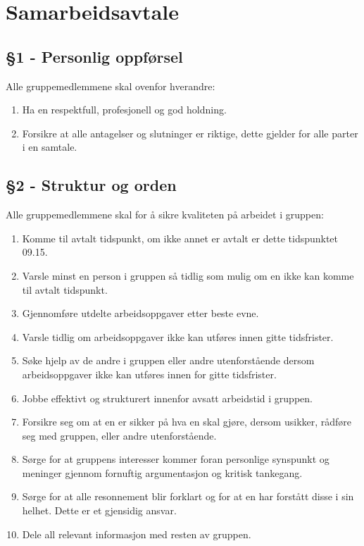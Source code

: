 \chapter{Samarbeidsavtale}
\section*{§1 - Personlig oppførsel}
Alle gruppemedlemmene skal ovenfor hverandre:
\begin{enumerate}
\item Ha en respektfull, profesjonell og god holdning.
\item Forsikre at alle antagelser og slutninger er riktige, dette gjelder for alle parter i en samtale.
\end{enumerate}
\section*{§2 - Struktur og orden}
Alle gruppemedlemmene skal for å sikre kvaliteten på arbeidet i gruppen:
\begin{enumerate}
\item Komme til avtalt tidspunkt, om ikke annet er avtalt er dette tidspunktet 09.15.
\item Varsle minst en person i gruppen så tidlig som mulig om en ikke kan komme til avtalt tidspunkt.
\item Gjennomføre utdelte arbeidsoppgaver etter beste evne.
\item Varsle tidlig om arbeidsoppgaver ikke kan utføres innen gitte tidsfrister. 
\item Søke hjelp av de andre i gruppen eller andre utenforstående dersom arbeidsoppgaver ikke kan utføres innen for gitte tidsfrister.
\item Jobbe effektivt og strukturert innenfor avsatt arbeidstid i gruppen.
\item Forsikre seg om at en er sikker på hva en skal gjøre, dersom usikker, rådføre seg med gruppen, eller andre utenforstående.
\item Sørge for at gruppens interesser kommer foran personlige synspunkt og meninger gjennom fornuftig argumentasjon og kritisk tankegang.
\item Sørge for at alle resonnement blir forklart og for at en har forstått disse i sin helhet. Dette er et gjensidig ansvar.
\item Dele all relevant informasjon med resten av gruppen.
\end{enumerate}
